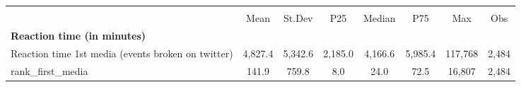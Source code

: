 {
\def\sym#1{\ifmmode^{#1}\else\(^{#1}\)\fi}
\begin{tabular}{l*{1}{ccccccc}}
\hline\hline
                    &\multicolumn{7}{c}{}                                                                      \\
                    &        Mean&      St.Dev&         P25&      Median&         P75&         Max&         Obs\\
\hline
\textbf{Reaction time (in minutes)}&            &            &            &            &            &            &            \\
Reaction time 1st media (events broken on twitter)&     4,827.4&     5,342.6&     2,185.0&     4,166.6&     5,985.4&     117,768&       2,484\\
rank\_first\_media    &       141.9&       759.8&         8.0&        24.0&        72.5&      16,807&       2,484\\
\hline\hline
\end{tabular}
}
